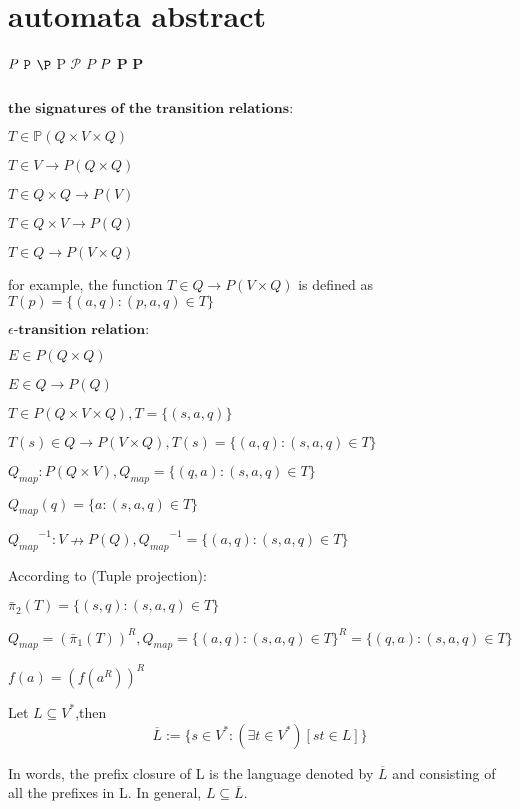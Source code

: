 \chapter{automata abstract}

$\emph{P}$ $\texttt{P}$ $\P$  $\mathrm{P}$  $\mathcal{P}$ $\mathit{P}$  $\mathnormal{P}$  $\boldsymbol{P}$  $\mathbf{P}$

\hfill

\section*{}
\cite[p6]{WATSON93a} $\textbf{the signatures of the transition relations:}$

$T \in \mathbb{P}(Q \times V \times Q)$

$T \in V \to P(Q \times Q)$

$T \in Q\times Q \to P(V)$

$T \in Q \times V \to P(Q)$

$T \in Q \to P(V \times Q)$

for example, the function $T \in Q \to P(V \times Q)$ is defined as $T(p) = \{(a,q):(p,a,q) \in T\}$

\hfill

$\textbf{$\epsilon$-transition relation:}$

$E \in P(Q\times Q)$

$E \in Q \to P(Q)$

\hfill

$T \in P(Q \times V \times Q), T = \{(s,a,q) \}$

$T(s)\in Q \to P(V\times Q), T(s) = \{(a,q):(s,a,q) \in T\}$

$Q_{map}: P(Q\times V), Q_{map} = \{(q,a): (s,a,q) \in T\}$

$Q_{map}(q) = \{a: (s,a,q)\in T\}$

${Q_{map}}^{-1}: V \nrightarrow P(Q), {Q_{map}}^{-1} = \{(a,q): (s,a,q) \in T\}$

According to \cite[Convention A.4]{WATSON93a} (Tuple projection):

$\bar{\pi}_2(T) = \{(s,q): (s,a,q)\in T \}$

$Q_{map} = (\bar{\pi}_1(T))^R, Q_{map} = \{(a,q):(s,a,q) \in T\}^R = \{(q,a):(s,a,q) \in T\}$

\hfill

$f(a)=(f(a^R))^R$

\hfill

\begin{definition}
	Let $L\subseteq V^*$,then
	$$\overline{L} := \{s\in V^*:(\exists t\in V^*)[st\in L]\}$$
\end{definition}
In words, the prefix closure of L is the language denoted by $\overline{L}$ and consisting of all the prefixes in L. In general, $L\subseteq \overline{L}$.

